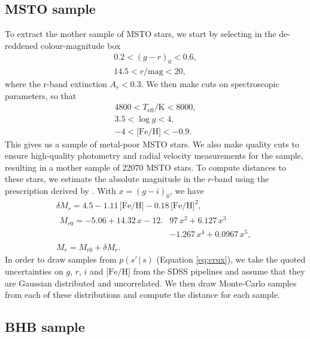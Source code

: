 \documentclass[useAMS,twocolumn,usenatbib]{mn2e}
\begin{document}
\subsection{MSTO sample}

To extract the mother sample of MSTO stars, we start by selecting in
the de-reddened colour-magnitude box
%
\begin{gather}
0.2 < (g-r)_0 < 0.6, \nonumber \\
14.5 < r/\mathrm{mag} < 20,
\end{gather}
%
where the r-band extinction $A_r<0.3$. We then make cuts on
spectroscopic parameters, so that
%
\begin{gather}
4800 < T_{\mathrm{eff}}/\mathrm{K} < 8000, \nonumber \\
3.5 < \log g < 4, \nonumber \\
-4 < \mathrm{\lbrack Fe/H \rbrack} < -0.9.
\end{gather}
% 
This gives us a sample of metal-poor MSTO stars. We also make quality
cuts to ensure high-quality photometry and radial velocity
measurements for the sample, resulting in a mother sample of 22070
MSTO stars. To compute distances to these stars, we estimate the
absolute magnitude in the $r$-band using the prescription derived by
\cite{Iv08}. With $x=(g-i)_0$, we have
%
\begin{gather}
\delta M_r = 4.5 - 1.11\,\lbrack \mathrm{Fe/H} \rbrack -0.18\,\lbrack \mathrm{Fe/H} \rbrack^2, \nonumber \\
\begin{split}
M_{r0} = -5.06 + 14.32\,x - 12.{}&97\,x^2 + 6.127\,x^3 \nonumber \\
                    {}&- 1.267\,x^4 + 0.0967\,x^5,
\end{split}\\
M_r = M_{r0} + \delta M_r.
\end{gather}
% 
In order to draw samples from $p(s' \,|\, s)$ (Equation
\ref{eq:crux}), we take the quoted uncertainties on $g$, $r$, $i$ and
$\lbrack \mathrm{Fe/H} \rbrack$ from the SDSS pipelines and assume
that they are Gaussian distributed and uncorrelated. We then draw
Monte-Carlo samples from each of these distributions and compute the
distance for each sample.

\subsection{BHB sample}
\end{document}
